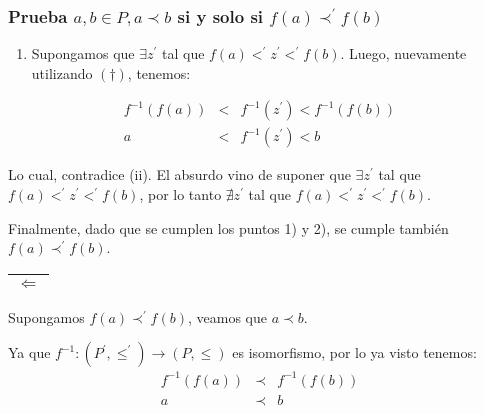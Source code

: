 \begin{frame}
	\frametitle{Prueba $a, b \in P, a \prec b$ si y solo si $f(a) \prec^{\prime} f(b)$}

	\begin{block}{}
		\begin{enumerate}[2)]
			\item Supongamos que $\exists z^{\prime}$ tal que $f(a) <^{\prime} z^{\prime} <^{\prime} f(b)$. Luego, nuevamente
			utilizando $(\dag)$, tenemos:
		\end{enumerate}
		\begin{eqnarray*}
			f^{-1}(f(a)) &<& f^{-1}(z^{\prime}) < f^{-1}(f(b)) \\
			a &<& f^{-1}(z^{\prime}) < b
		\end{eqnarray*}

		\PN Lo cual, contradice (ii). El absurdo vino de suponer que $\exists z^{\prime}$ tal que
		$f(a) <^{\prime} z^{\prime} <^{\prime} f(b)$, por lo tanto $\nexists z^{\prime}$ tal que
		$f(a) <^{\prime} z^{\prime} <^{\prime} f(b)$.

		\PN Finalmente, dado que se cumplen los puntos 1) y 2), se cumple también $f(a) \prec^{\prime} f(b)$.

		\vspace{5mm}
		\PN \begin{tabular}{|c|} \hline $\Leftarrow$ \\\hline \end{tabular} Supongamos $f(a) \prec^{\prime} f(b)$, veamos
		que $a \prec b$.

		\PN Ya que $f^{-1}: (P^{\prime}, \leq^{\prime}) \rightarrow (P, \leq)$ es isomorfismo, por lo ya visto tenemos:
		\begin{eqnarray*}
			f^{-1}(f(a)) &\prec& f^{-1}(f(b)) \\
			a &\prec& b
		\end{eqnarray*}
	\end{block}
\end{frame}
